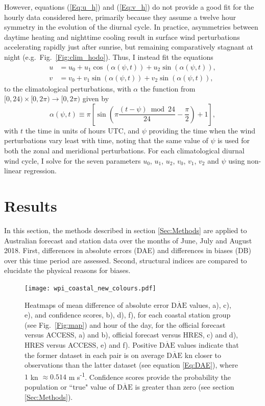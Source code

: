 \documentclass[twocol]{ametsoc}
\begin{document}
However, equations (\ref{Eq:u_h}) and (\ref{Eq:v_h}) do not provide a good fit for the hourly data considered here, primarily because they assume a twelve hour symmetry in the evolution of the diurnal cycle. In practice, asymmetries between daytime heating and nighttime cooling \citep[e.g.][]{svensson11} result in surface wind perturbations accelerating rapidly just after sunrise, but remaining comparatively stagnant at night (e.g.~Fig.~\ref{Fig:clim_hodo}). Thus, I instead fit the equations
\begin{align}
u &= u_0 + u_1 \cos(\alpha(\psi,t)) + u_2 \sin(\alpha(\psi,t)), \label{Eq:u} \\
v &= v_0 + v_1 \sin(\alpha(\psi,t)) + v_2 \sin(\alpha(\psi,t)), \label{Eq:v}
\end{align}
to the climatological perturbations, with $\alpha$ the function from $[0,24) \times [0, 2\pi) \to [0, 2\pi)$ given by
\begin{equation}
\alpha(\psi,t) \equiv \pi \left[\sin\left( \pi \frac{(t - \psi)  \bmod 24}{24} - \frac{\pi}{2} \right) + 1 \right], \label{Eq:alpha}
\end{equation}
with $t$ the time in units of hours UTC, and $\psi$ providing the time when the wind perturbations vary least with time, noting that the same value of $\psi$ is used for both the zonal and meridional perturbations. For each climatological diurnal wind cycle, I solve for the seven parameters $u_0$, $u_1$, $u_2$, $v_0$, $v_1$, $v_2$ and $\psi$ using non-linear regression.

\section{Results}
\label{Sec:Results}
In this section, the methods described in section \ref{Sec:Methods} are applied to Australian forecast and station data over the months of June, July and August 2018. First, differences in absolute errors (DAE) and differences in biases (DB) over this time period are assessed. Second, structural indices are compared to elucidate the physical reasons for biases. 

\begin{figure}
\centering
\texttt{[image: wpi\_coastal\_new\_colours.pdf]}
\caption{Heatmaps of mean difference of absolute error $\overline{\text{DAE}}$ values, a), c), e), and confidence scores, b), d), f), for each coastal station group (see Fig.~\ref{Fig:map}) and hour of the day, for the official forecast versus ACCESS, a) and b), official forecast versus HRES, c) and d), HRES versus ACCESS, e) and f). Positive $\overline{\text{DAE}}$ values indicate that the former dataset in each pair is on average $\overline{\text{DAE}}$ kn closer to observations than the latter dataset (see equation \ref{Eq:DAE}), where $1$ kn $\approx 0.514$ m s\textsuperscript{-1}. Confidence scores provide the probability the population or ``true" value of $\overline{\text{DAE}}$ is greater than zero (see section \ref{Sec:Methods}).}
\label{Fig:wpi_coastal}
\end{figure}
\end{document}
